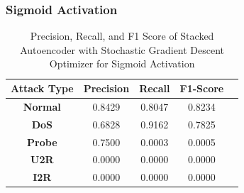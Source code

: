 \documentclass[12pt, a4paper]{report}
\begin{document}
\subsubsection{Sigmoid Activation}

\begin{table}[ht]
\centering
\captionsetup{justification=centering,margin=2cm}
\begin{tabular}{|c|c|c|c|c|}
\hline
\multicolumn{1}{|c|}{\textbf{Attack Type}} & \multicolumn{1}{c|}{\textbf{Precision}} & \multicolumn{1}{c|}{\textbf{Recall}} & \multicolumn{1}{c|}{\textbf{F1-Score}} \\ \hline
\textbf{Normal}        & 0.8429                                   & 0.8047                                & 0.8234                                                                  \\ \hline
\textbf{DoS}           & 0.6828                                  & 0.9162                                &  0.7825                                                                    \\ \hline
\textbf{Probe}         & 0.7500                                  & 0.0003                                & 0.0005                                                                  \\ \hline
\textbf{U2R}           & 0.0000                                    & 0.0000                                & 0.0000                                                                   \\ \hline
\textbf{I2R}           & 0.0000                                      & 0.0000                                   & 0.0000                                                            \\ \hline         \end{tabular}
\caption{Precision, Recall, and F1 Score of Stacked Autoencoder with Stochastic Gradient Descent Optimizer for Sigmoid Activation}
\label{prf1_sgd_sigmoid_auto}
\end{table}
\end{document}

